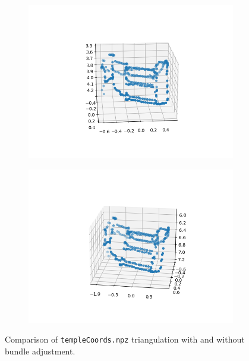 \documentclass{article} %
\begin{document}
    \begin{figure}[h]
        \begin{subfigure}[b]{0.5\textwidth}
            \includegraphics[width=\textwidth]{q5,3_init2.png}
        \end{subfigure}
        \begin{subfigure}[b]{0.5\textwidth}
            \includegraphics[width=\textwidth]{q5,3_opt2.png}
        \end{subfigure}
        \caption{Comparison of \texttt{templeCoords.npz} triangulation with and without bundle adjustment.}
    \end{figure}
    
\end{document}
